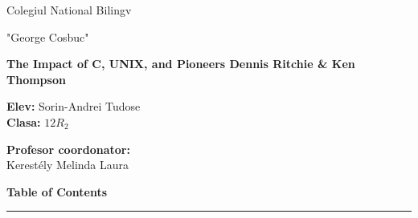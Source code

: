 \documentclass[12pt]{article}
\begin{document}
\thispagestyle{empty}   %
\begin{center}
    \vspace*{\fill}     %

    \huge Colegiul National Bilingv

    \huge "George Cosbuc"

    \vspace{4cm}

    \textbf{\Huge The Impact of C, UNIX, and Pioneers Dennis Ritchie \& Ken Thompson}

    \vspace{10cm}

    \begin{minipage}[t]{0.5\textwidth}
        \Large \textbf{Elev:}
        \large Sorin-Andrei Tudose \\
        \Large \textbf{Clasa:}
        \Large $12R_2$
    \end{minipage}%
    \begin{minipage}[t]{0.5\textwidth}
        \raggedleft
        \Large \textbf{Profesor coordonator:} \\
        \large Kerestély Melinda Laura
    \end{minipage}

    \vspace*{\fill}     %
\end{center}


\newpage
\begin{center}
    \vspace*{\fill}     %
    \Huge\textbf{Table of Contents}
    \par\noindent\rule{\textwidth}{0.4pt}
    \small\tableofcontents
    \vspace*{\fill}     %
\end{center}

\newpage
\end{document}
